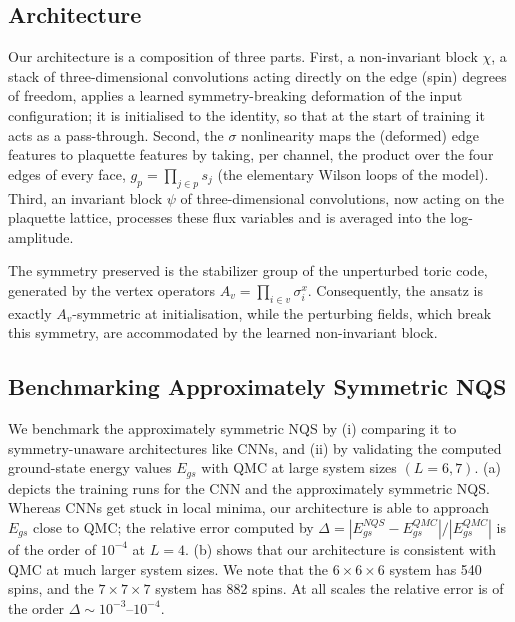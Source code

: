 \documentclass[
  aps,            %
  prl,            %
  reprint,        %
  groupedaddress, %
  amsmath,amssymb,
  floatfix,       %
  nofootinbib,    %
  longbibliography %
]{revtex4-2}
\begin{document}
\subsection{Architecture}

Our architecture is a composition of three parts. First, a non-invariant block $\chi$, a stack of three-dimensional convolutions acting directly on the edge (spin) degrees of freedom, applies a learned symmetry-breaking deformation of the input configuration; it is initialised to the identity, so that at the start of training it acts as a pass-through. Second, the $\sigma$ nonlinearity maps the (deformed) edge features to plaquette features by taking, per channel, the product over the four edges of every face, $g_p = \prod_{j \in p} s_j$ (the elementary Wilson loops of the model). Third, an invariant block $\psi$ of three-dimensional convolutions, now acting on the plaquette lattice, processes these flux variables and is averaged into the log-amplitude. 

The symmetry preserved is the stabilizer group of the unperturbed toric code, generated by the vertex operators $A_v = \prod_{i \in v} \sigma^x_i$. Consequently, the ansatz is exactly $A_v$-symmetric at initialisation, while the perturbing fields, which break this symmetry, are accommodated by the learned non-invariant block.

\subsection{Benchmarking Approximately Symmetric NQS}
We benchmark the approximately symmetric NQS by (i) comparing it to symmetry-unaware architectures like CNNs, and (ii) by validating the computed ground-state energy values $E_{gs}$ with QMC \cite{linsel2025,pmrqmc2024} at large system sizes $(L = 6, 7)$. (a) depicts the training runs for the CNN and the approximately symmetric NQS. Whereas CNNs get stuck in local minima, our architecture is able to approach $E_{gs}$ close to QMC; the relative error computed by $\Delta = |E_{gs}^{NQS} - E_{gs}^{QMC}|/|E_{gs}^{QMC}|$ is of the order of $10^{-4}$ at $L=4$. (b) shows that our architecture is consistent with QMC at much larger system sizes. We note that the $6\times 6 \times 6$ system has 540 spins, and the $7\times 7 \times 7$ system has 882 spins. At all scales the relative error is of the order $\Delta \sim 10^{-3}$--$10^{-4}$.
\end{document}
